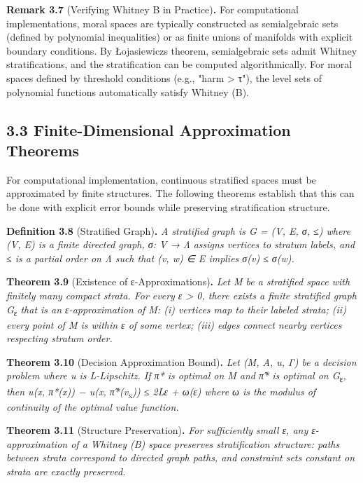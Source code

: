 \documentclass[12pt]{article}
\theoremstyle{plain}
\theoremstyle{definition}
\theoremstyle{remark}
\begin{document}
\textbf{Remark 3.7} (Verifying Whitney B in Practice)\textbf{.} For
computational implementations, moral spaces are typically constructed as
semialgebraic sets (defined by polynomial inequalities) or as finite
unions of manifolds with explicit boundary conditions. By
Łojasiewicz\textquotesingle s theorem, semialgebraic sets admit Whitney
stratifications, and the stratification can be computed algorithmically.
For moral spaces defined by threshold conditions (e.g., "harm
\textgreater{} τ"), the level sets of polynomial functions automatically
satisfy Whitney (B).

\subsection{3.3 Finite-Dimensional Approximation
Theorems}\label{finite-dimensional-approximation-theorems}

For computational implementation, continuous stratified spaces must be
approximated by finite structures. The following theorems establish that
this can be done with explicit error bounds while preserving
stratification structure.

\textbf{Definition 3.8} (Stratified Graph)\textbf{.} \emph{A stratified
graph is G = (V, E, σ, ≤) where (V, E) is a finite directed graph, σ: V
→ Λ assigns vertices to stratum labels, and ≤ is a partial order on Λ
such that (v, w) ∈ E implies σ(v) ≤ σ(w).}

\textbf{Theorem 3.9} (Existence of ε-Approximations)\textbf{.} \emph{Let
M be a stratified space with finitely many compact strata. For every ε
\textgreater{} 0, there exists a finite stratified graph
G}\textsubscript{ε} \emph{that is an ε-approximation of M: (i) vertices
map to their labeled strata; (ii) every point of M is within ε of some
vertex; (iii) edges connect nearby vertices respecting stratum order.}

\textbf{Theorem 3.10} (Decision Approximation Bound)\textbf{.} \emph{Let
(M, A, u, Γ) be a decision problem where u is L-Lipschitz. If π* is
optimal on M and π̂* is optimal on G}\textsubscript{ε}\emph{, then
\textbar u(x, π*(x)) − u(x, π̂*(v}\textsubscript{x}\emph{))\textbar{} ≤
2Lε + ω(ε) where ω is the modulus of continuity of the optimal value
function.}

\textbf{Theorem 3.11} (Structure Preservation)\textbf{.} \emph{For
sufficiently small ε, any ε-approximation of a Whitney (B) space
preserves stratification structure: paths between strata correspond to
directed graph paths, and constraint sets constant on strata are exactly
preserved.}
\end{document}
